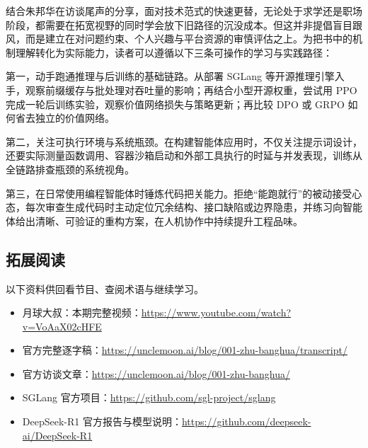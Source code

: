 \documentclass[UTF8,a4paper,11pt,fontset=fandol]{ctexart}
\begin{document}
结合朱邦华在访谈尾声的分享，面对技术范式的快速更替，无论处于求学还是职场阶段，都需要在拓宽视野的同时学会放下旧路径的沉没成本。但这并非提倡盲目跟风，而是建立在对问题约束、个人兴趣与平台资源的审慎评估之上。为把书中的机制理解转化为实际能力，读者可以遵循以下三条可操作的学习与实践路径：

第一，动手跑通推理与后训练的基础链路。从部署 SGLang 等开源推理引擎入手，观察前缀缓存与批处理对吞吐量的影响；再结合小型开源权重，尝试用 PPO 完成一轮后训练实验，观察价值网络损失与策略更新；再比较 DPO 或 GRPO 如何省去独立的价值网络。

第二，关注可执行环境与系统瓶颈。在构建智能体应用时，不仅关注提示词设计，还要实际测量函数调用、容器沙箱启动和外部工具执行的时延与并发表现，训练从全链路排查瓶颈的系统视角。

第三，在日常使用编程智能体时锤炼代码把关能力。拒绝“能跑就行”的被动接受心态，每次审查生成代码时主动定位冗余结构、接口缺陷或边界隐患，并练习向智能体给出清晰、可验证的重构方案，在人机协作中持续提升工程品味。
\subsection{拓展阅读}
以下资料供回看节目、查阅术语与继续学习。
\begin{itemize}
\item 月球大叔：本期完整视频：\url{https://www.youtube.com/watch?v=VoAaX02cHFE}
\item 官方完整逐字稿：\url{https://unclemoon.ai/blog/001-zhu-banghua/transcript/}
\item 官方访谈文章：\url{https://unclemoon.ai/blog/001-zhu-banghua/}
\item SGLang 官方项目：\url{https://github.com/sgl-project/sglang}
\item DeepSeek-R1 官方报告与模型说明：\url{https://github.com/deepseek-ai/DeepSeek-R1}
\end{itemize}
\end{document}
